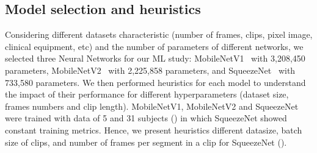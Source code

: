 \documentclass[mlabstract,twocolumn]{jmlr}
\begin{document}
\subsection{Model selection and heuristics}
Considering different datasets characteristic (number of frames, clips, pixel image, clinical equipment, etc) and the number of parameters of different networks,
we selected three Neural Networks for our ML study:
MobileNetV1~\citep{2017-howared_CoRR_MobileNetV1} with 3,208,450 parameters, MobileNetV2~\citep{Sandler_2018_CVPR_MobileNetV2} with 2,225,858 parameters, and SqueezeNet~\citep{iandola2017squeezenet} with 733,580 parameters.
We then performed heuristics for each model to understand the impact of their performance for different hyperparameters (dataset size, frames numbers and clip length). %
MobileNetV1, MobileNetV2 and SqueezeNet were trained with data of 5 and 31 subjects () in which SqueezeNet showed constant training metrics.
Hence, we present heuristics different datasize, batch size of clips, and number of frames per segment in a clip for SqueezeNet ().
\end{document}
